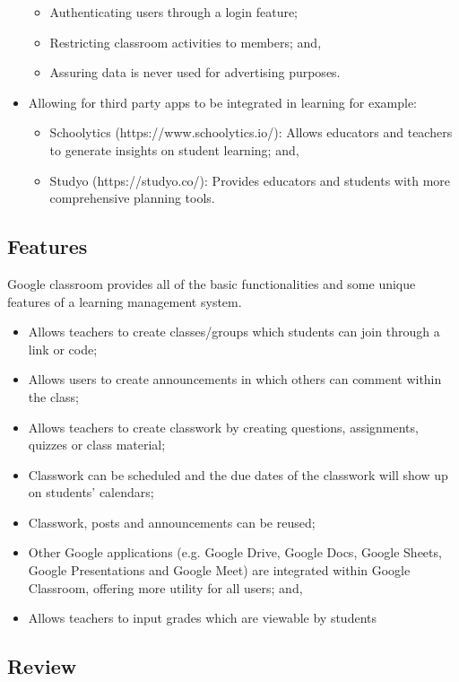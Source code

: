 \begin{itemize}
\begin{itemize}
        \item Authenticating users through a login feature;
        \item Restricting classroom activities to members; and,
        \item Assuring data is never used for advertising purposes.
    \end{itemize}
    \item Allowing for third party apps to be integrated in learning for example:
    \begin{itemize}
        \item Schoolytics (https://www.schoolytics.io/): Allows educators and teachers to generate insights on student learning; and,
        \item Studyo (https://studyo.co/): Provides educators and students with more comprehensive planning tools.
    \end{itemize}
\end{itemize}

\subsection{Features}
Google classroom provides all of the basic functionalities and some unique features of a learning management system.
\begin{itemize}
    \item Allows teachers to create classes/groups which students can join through a link or code;
    \item Allows users to create announcements in which others can comment within the class;
    \item Allows teachers to create classwork by creating questions, assignments, quizzes or class material;
    \item Classwork can be scheduled and the due dates of the classwork will show up on students’ calendars;
    \item Classwork, posts and announcements can be reused;
    \item Other Google applications (e.g. Google Drive, Google Docs, Google Sheets, Google Presentations and Google Meet) are integrated within Google Classroom, offering more utility for all users; and,
    \item Allows teachers to input grades which are viewable by students
\end{itemize}

\newpage

\subsection{Review}

